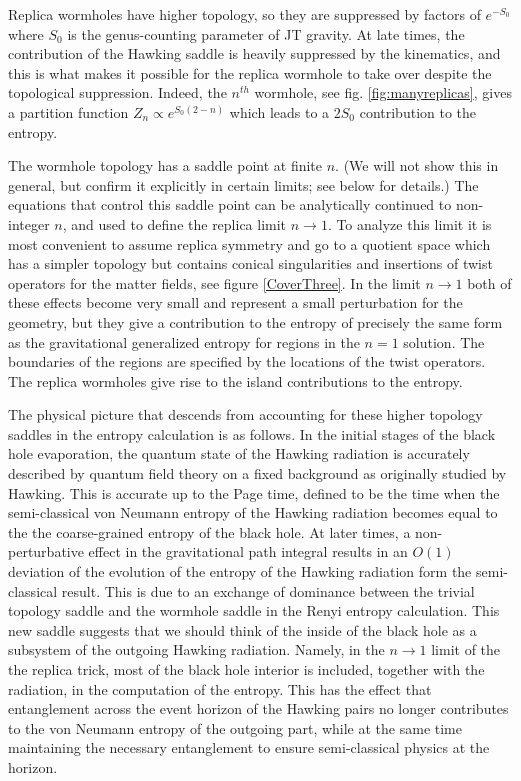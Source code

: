 Replica wormholes have higher topology, so they are suppressed by factors of $e^{-S_0}$ where $S_0$ is the genus-counting parameter of JT gravity. At late times, the contribution of the Hawking saddle is heavily suppressed by the kinematics, and this is what makes it possible for the replica wormhole to take over despite the topological suppression. Indeed, the
$n^{th}$ wormhole, see fig. \ref{fig:manyreplicas}, gives a partition function $Z_n \propto 
e^{ S_0 (2 -n) } $ which leads to a $2S_0$ contribution to the  entropy.  

The wormhole topology has a saddle point at finite $n$. (We will not show this in general, but confirm it explicitly in certain limits; see below for details.) The equations that control this saddle point can be analytically continued to non-integer $n$, and used to define the replica limit $n \to 1$. 
To analyze this limit it is most convenient to assume replica symmetry and go to a quotient space which has a simpler topology but contains conical singularities and insertions of twist operators for the matter 
fields, see figure \ref{CoverThree}. In the limit $n\to 1$ both of these effects become very small and represent a small perturbation for the geometry, but they give a contribution to the entropy of precisely the same form as the gravitational generalized entropy for regions in the $n=1$ solution. The boundaries of the regions are specified by the locations of the twist operators. The replica wormholes give rise to the island contributions to the   entropy.


The physical picture that descends from accounting for these higher
topology saddles in the entropy calculation is as follows. In the
initial stages of the black hole evaporation, the quantum state of the
Hawking radiation is accurately described by quantum field theory on a
fixed background as originally studied by Hawking. This is accurate up to the Page time, defined to be the time when 
the semi-classical von Neumann
entropy of the Hawking radiation becomes equal to the the coarse-grained entropy
of the black hole. 
 At later times,  a non-perturbative effect in the gravitational path
integral results in an $O(1)$ deviation of the evolution of the
entropy of the Hawking radiation form the semi-classical result. This
is due to an exchange of dominance between the trivial topology
saddle and the wormhole saddle in the Renyi entropy calculation. This
new saddle suggests that we should think of the inside of the black hole as
a subsystem of the outgoing Hawking radiation. Namely, in the $n\to 1$ limit of the the replica trick, most of the black hole interior is included, together with the radiation, in the computation of the entropy.  This has the effect
that entanglement across the event horizon of the Hawking pairs no
longer contributes to the von Neumann entropy of the outgoing part,
while at the same time maintaining the necessary entanglement to
ensure semi-classical physics at the horizon.
  
